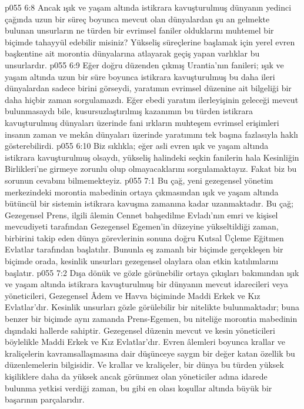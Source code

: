 \vs p055 6:8 Ancak ışık ve yaşam altında istikrara kavuşturulmuş dünyanın yedinci çağında uzun bir süreç boyunca mevcut olan dünyalardan şu an gelmekte bulunan unsurların ne türden bir evrimsel faniler olduklarını muhtemel bir biçimde tahayyül edebilir misiniz? Yükseliş süreçlerine başlamak için yerel evren başkentine ait morontia dünyalarına atlayarak geçiş yapan varlıklar bu unsurlardır.
\vs p055 6:9 Eğer doğru düzenden çıkmış Urantia’nın fanileri; ışık ve yaşam altında uzun bir süre boyunca istikrara kavuşturulmuş bu daha ileri dünyalardan sadece birini görseydi, yaratımın evrimsel düzenine ait bilgeliği bir daha hiçbir zaman sorgulamazdı. Eğer ebedi yaratım ilerleyişinin geleceği mevcut bulunmasaydı bile, kusursuzlaştırılmış kazanımın bu türden istikrara kavuşturulmuş dünyaları üzerinde fani ırkların muhteşem evrimsel erişimleri insanın zaman ve mekân dünyaları üzerinde yaratımını tek başına fazlasıyla haklı gösterebilirdi.
\vs p055 6:10 Biz sıklıkla; eğer asli evren ışık ve yaşam altında istikrara kavuşturulmuş olsaydı, yükseliş halindeki seçkin fanilerin hala Kesinliğin Birlikleri’ne girmeye zorunlu olup olmayacaklarını sorgulamaktayız. Fakat biz bu sorunun cevabını bilmemekteyiz.
\vs p055 7:1 Bu çağ, yeni gezegensel yönetim merkezindeki morontia mabedinin ortaya çıkmasından ışık ve yaşam altında bütüncül bir sistemin istikrara kavuşma zamanına kadar uzanmaktadır. Bu çağ; Gezegensel Prens, ilgili âlemin Cennet bahşedilme Evladı’nın emri ve kişisel mevcudiyeti tarafından Gezegensel Egemen’in düzeyine yükseltildiği zaman, birbirini takip eden dünya görevlerinin sonuna doğru Kutsal Üçleme Eğitmen Evlatlar tarafından başlatılır. Bununla eş zamanlı bir biçimde gerçekleşen bir biçimde orada, kesinlik unsurları gezegensel olaylara olan etkin katılımlarını başlatır.
\vs p055 7:2 Dışa dönük ve gözle görünebilir ortaya çıkışları bakımından ışık ve yaşam altında istikrara kavuşturulmuş bir dünyanın mevcut idarecileri veya yöneticileri, Gezegensel Âdem ve Havva biçiminde Maddi Erkek ve Kız Evlatlar’dır. Kesinlik unsurları gözle görülebilir bir nitelikte bulunmaktadır; buna benzer bir biçimde aynı zamanda Prens\hyp{}Egemen, bu niteliğe morontia mabedinin dışındaki hallerde sahiptir. Gezegensel düzenin mevcut ve kesin yöneticileri böylelikle Maddi Erkek ve Kız Evlatlar’dır. Evren âlemleri boyunca krallar ve kraliçelerin kavramsallaşmasına dair düşünceye saygın bir değer katan özellik bu düzenlemelerin bilgisidir. Ve krallar ve kraliçeler, bir dünya bu türden yüksek kişiliklere daha da yüksek ancak görünmez olan yöneticiler adına idarede bulunma yetkisi verdiği zaman, bu gibi en olası koşullar altında büyük bir başarının parçalarıdır.
